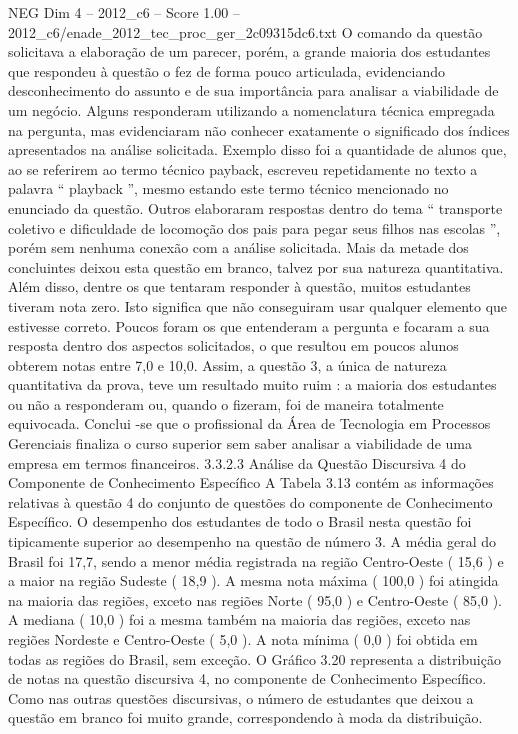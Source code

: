\begin{textsample}{NEG Dim 4 – 2012\_c6 – Score 1.00 – 2012\_c6/enade\_2012\_tec\_proc\_ger\_2c09315dc6.txt}
O comando da questão solicitava a elaboração de um parecer, porém, a grande maioria dos estudantes que respondeu à questão o fez de forma pouco articulada, evidenciando desconhecimento do assunto e de sua importância para analisar a viabilidade de um negócio.
Alguns responderam utilizando a nomenclatura técnica empregada na pergunta, mas evidenciaram não conhecer exatamente o significado dos índices apresentados na análise solicitada.
Exemplo disso foi a quantidade de alunos que, ao se referirem ao termo técnico payback, escreveu repetidamente no texto a palavra “ playback ”, mesmo estando este termo técnico mencionado no enunciado da questão.
Outros elaboraram respostas dentro do tema “ transporte coletivo e dificuldade de locomoção dos pais para pegar seus filhos nas escolas ”, porém sem nenhuma conexão com a análise solicitada.
Mais da metade dos concluintes deixou esta questão em branco, talvez por sua natureza quantitativa.
Além disso, dentre os que tentaram responder à questão, muitos estudantes tiveram nota zero.
Isto significa que não conseguiram usar qualquer elemento que estivesse correto.
Poucos foram os que entenderam a pergunta e focaram a sua resposta dentro dos aspectos solicitados, o que resultou em poucos alunos obterem notas entre 7,0 e 10,0.
Assim, a questão 3, a única de natureza quantitativa da prova, teve um resultado muito ruim : a maioria dos estudantes ou não a responderam ou, quando o fizeram, foi de maneira totalmente equivocada.
Conclui -se que o profissional da Área de Tecnologia em Processos Gerenciais finaliza o curso superior sem saber analisar a viabilidade de uma empresa em termos financeiros. 3.3.2.3 Análise da Questão Discursiva 4 do Componente de Conhecimento Específico A Tabela 3.13 contém as informações relativas à questão 4 do conjunto de questões do componente de Conhecimento Específico.
O desempenho dos estudantes de todo o Brasil nesta questão foi tipicamente superior ao desempenho na questão de número 3.
A média geral do Brasil foi 17,7, sendo a menor média registrada na região Centro-Oeste ( 15,6 ) e a maior na região Sudeste ( 18,9 ).
A mesma nota máxima ( 100,0 ) foi atingida na maioria das regiões, exceto nas regiões Norte ( 95,0 ) e Centro-Oeste ( 85,0 ).
A mediana ( 10,0 ) foi a mesma também na maioria das regiões, exceto nas regiões Nordeste e Centro-Oeste ( 5,0 ).
A nota mínima ( 0,0 ) foi obtida em todas as regiões do Brasil, sem exceção.
O Gráfico 3.20 representa a distribuição de notas na questão discursiva 4, no componente de Conhecimento Específico.
Como nas outras questões discursivas, o número de estudantes que deixou a questão em branco foi muito grande, correspondendo à moda da distribuição.

\end{textsample}
